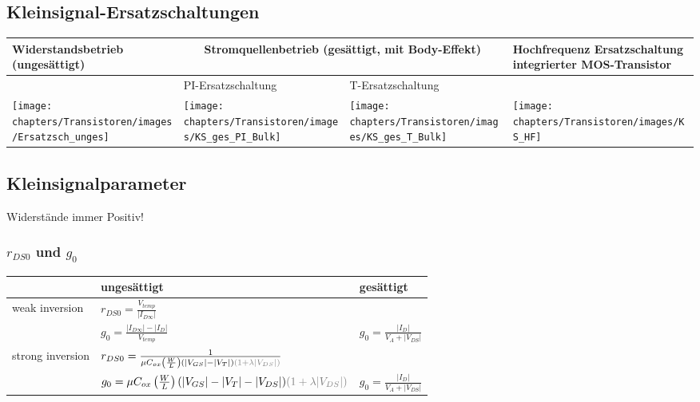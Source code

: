 \subsection{Kleinsignal-Ersatzschaltungen }
\begin{tabular}{|p{}|p{}|p{}|p{}|}
	\hline
	Widerstandsbetrieb (ungesättigt)&\multicolumn{2}{c|}{Stromquellenbetrieb (gesättigt, mit Body-Effekt)}&Hochfrequenz Ersatzschaltung integrierter MOS-Transistor\\ \hline
	& PI-Ersatzschaltung&T-Ersatzschaltung&\\
	\texttt{[image: chapters/Transistoren/images/Ersatzsch\_unges]}&
	\texttt{[image: chapters/Transistoren/images/KS\_ges\_PI\_Bulk]}&
	\texttt{[image: chapters/Transistoren/images/KS\_ges\_T\_Bulk]}&
	\texttt{[image: chapters/Transistoren/images/KS\_HF]}\\ \hline
\end{tabular}

\subsection{Kleinsignalparameter}
Widerstände immer Positiv!\\
\subsubsection{$r_{DS0}$ und $g_0$}
\begin{tabular}{|l|l|l|}
    \hline
    & ungesättigt & gesättigt\\
    \hline
    weak inversion & $r_{DS0} = \frac{V_{temp}}{|I_{D\infty}|}$ & \\
                   & $g_0 = \frac{|I_{D\infty}|- |I_D|}{V_{temp}}$ & $g_0 = \frac{|I_D|}{V_A+|V_{DS}|}$\\
    \hline
    strong inversion & $r_{DS0} = \frac{1}{\mu C_{ox} \left(\frac W L\right) (|V_{GS}|-|V_{T}|)\color{gray} (1+\lambda|V_{DS}|)}$&\\
    &$g_0 = \mu C_{ox} \left(\frac W L\right) (|V_{GS}|-|V_T|-|V_{DS}|) \color{gray} (1+\lambda|V_{DS}|)$& $g_0 = \frac{|I_D|}{V_A + |V_{DS}|}$\\
    \hline
\end{tabular}\\

